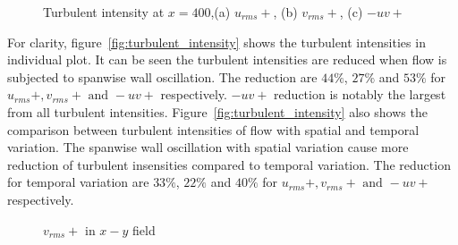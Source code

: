 \begin{figure}[!h]
  \ContinuedFloat
  \centering
  \caption{Turbulent intensity at $x=400$,(a) $u_{rms}+$, (b) $v_{rms}+$, (c) $-uv+$}
\end{figure}

For clarity, figure~\ref{fig:turbulent_intensity} shows the turbulent intensities in individual plot. It can be seen the turbulent intensities are reduced when flow is subjected to spanwise wall oscillation. The reduction are $44\%$, $27\%$ and $53\%$ for $u_{rms}+, v_{rms}+ \mbox{ and } -uv+$ respectively. $-uv+$ reduction is notably the largest from all turbulent intensities. Figure~\ref{fig:turbulent_intensity} also shows the comparison between turbulent intensities of flow with spatial and temporal variation. The spanwise wall oscillation with spatial variation cause more reduction of turbulent insensities compared to temporal variation. The reduction for temporal variation are $33\%$, $22\%$ and $40\%$ for $u_{rms}+, v_{rms}+ \mbox{ and } -uv+$ respectively.

\begin{figure}[!h]
  \centering
  \caption{$v_{rms}+$ in $x-y$ field}
  \label{fig:vrms+_xy}
\end{figure}


